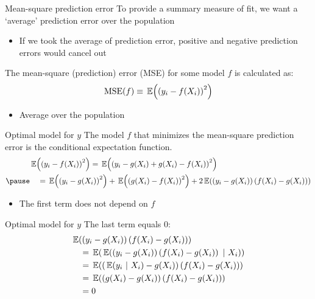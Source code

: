 \documentclass[aspectratio=169,t,11pt,table]{beamer}
\begin{document}
\begin{frame}{Mean-square prediction error}
  To provide a summary measure of fit, we want a `average' prediction error over the population
  \begin{itemize}
    \item If we took the average of prediction error, positive and negative prediction errors would cancel out
  \end{itemize}

  \pause
  \bigskip
  The \alert{mean-square (prediction) error} (MSE) for some model $f$ is calculated as:
  \begin{equation}\label{eq:mspe}
    \text{MSE}(f) \equiv \expec{\left( y_i - f(X_i) \right)^2}
  \end{equation}
  \vspace*{-\bigskipamount}
  \begin{itemize}
    \item Average over the population
  \end{itemize}
\end{frame}

\begin{frame}{Optimal model for $y$}
  The model $f$ that minimizes the mean-square prediction error is the conditional expectation function.
  \begin{align*}
    &\expec{\left( y_i - f(X_i) \right)^2} = \expec{\left( y_i - g(X_i) + g(X_i) - f(X_i) \right)^2} \\ \pause
    &\quad= \expec{\left( y_i - g(X_i) \right)^2} + \expec{\left( g(X_i) - f(X_i) \right)^2} + 2 \expec{\left( y_i - g(X_i) \right) \left( f(X_i) - g(X_i) \right)}
  \end{align*}

  \begin{itemize}
    \item The first term does not depend on $f$
  \end{itemize}
\end{frame}

\begin{frame}{Optimal model for $y$}
  The last term equals $0$: 
  \begin{align*}
    & \expec{\left( y_i - g(X_i) \right) \left( f(X_i) - g(X_i) \right)} \\
    &\quad= \expec{\expec{\left( y_i - g(X_i) \right) \left( f(X_i) - g(X_i) \right)}{X_i}} \\
    &\quad= \expec{\left( \expec{y_i}{X_i} - g(X_i) \right) \left( f(X_i) - g(X_i) \right)} \\
    &\quad= \expec{\left( g(X_i) - g(X_i) \right) \left( f(X_i) - g(X_i) \right)} \\
    &\quad= 0
  \end{align*}
\end{frame}
\end{document}
